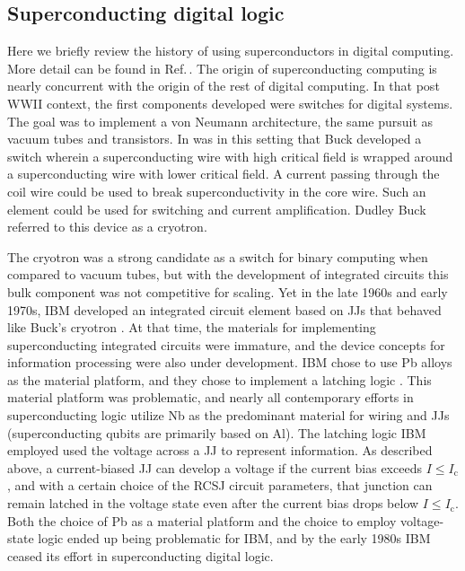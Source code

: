 \documentclass[twocolumn]{article}
\begin{document}
\subsection{Superconducting digital logic}
Here we briefly review the history of using superconductors in digital computing. More detail can be found in Ref.\,\cite{li2012}. The origin of superconducting computing is nearly concurrent with the origin of the rest of digital computing. In that post WWII context, the first components developed were switches for digital systems. The goal was to implement a von Neumann architecture, the same pursuit as vacuum tubes and transistors. In was in this setting that Buck developed a switch wherein a superconducting wire with high critical field is wrapped around a superconducting wire with lower critical field. A current passing through the coil wire could be used to break superconductivity in the core wire. Such an element could be used for switching and current amplification. Dudley Buck referred to this device as a cryotron.

The cryotron was a strong candidate as a switch for binary computing when compared to vacuum tubes, but with the development of integrated circuits this bulk component was not competitive for scaling. Yet in the late 1960s and early 1970s, IBM developed an integrated circuit element based on JJs that behaved like Buck's cryotron \cite{an1980}. At that time, the materials for implementing superconducting integrated circuits were immature, and the device concepts for information processing were also under development. IBM chose to use Pb alloys as the material platform, and they chose to implement a latching logic \cite{lise1991}. This material platform was problematic, and nearly all contemporary efforts in superconducting logic utilize Nb as the predominant material for wiring and JJs (superconducting qubits are primarily based on Al). The latching logic IBM employed used the voltage across a JJ to represent information. As described above, a current-biased JJ can develop a voltage if the current bias exceeds $I\le I_{\mathrm{c}}$, and with a certain choice of the RCSJ circuit parameters, that junction can remain latched in the voltage state even after the current bias drops below $I\le I_{\mathrm{c}}$. Both the choice of Pb as a material platform and the choice to employ voltage-state logic ended up being problematic for IBM, and by the early 1980s IBM ceased its effort in superconducting digital logic.
\end{document}
